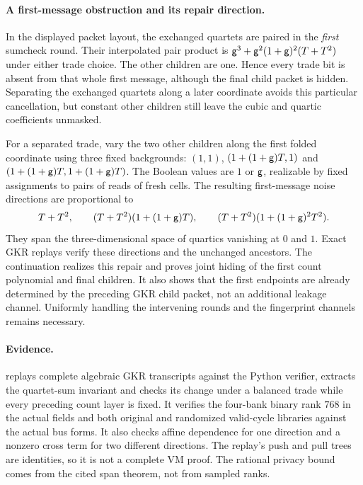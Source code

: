 \paragraph{A first-message obstruction and its repair direction.} In the displayed packet layout, the exchanged quartets are paired in the \emph{first} sumcheck round. Their interpolated pair product is $\mathsf{g}^3+\mathsf{g}^2(1+\mathsf{g})^2(T+T^2)$ under either trade choice. The other children are one. Hence every trade bit is absent from that whole first message, although the final child packet is hidden. Separating the exchanged quartets along a later coordinate avoids this particular cancellation, but constant other children still leave the cubic and quartic coefficients unmasked.

For a separated trade, vary the two other children along the first folded coordinate using three fixed backgrounds: $(1,1)$, $(1+(1+\mathsf{g})T,1)$ and $(1+(1+\mathsf{g})T,1+(1+\mathsf{g})T)$. The Boolean values are $1$ or $\mathsf{g}$, realizable by fixed assignments to pairs of reads of fresh cells. The resulting first-message noise directions are proportional to
\[
 T+T^2,\qquad
 (T+T^2)(1+(1+\mathsf{g})T),\qquad
 (T+T^2)(1+(1+\mathsf{g})^2T^2).
\]
They span the three-dimensional space of quartics vanishing at $0$ and $1$. Exact GKR replays verify these directions and the unchanged ancestors. The continuation  realizes this repair and proves joint hiding of the first count polynomial and final children. It also shows that the first endpoints are already determined by the preceding GKR child packet, not an additional leakage channel. Uniformly handling the intervening rounds and the fingerprint channels remains necessary.

\paragraph{Evidence.}  replays complete algebraic GKR transcripts against the Python verifier, extracts the quartet-sum invariant and checks its change under a balanced trade while every preceding count layer is fixed. It verifies the four-bank binary rank $768$ in the actual fields and both original and randomized valid-cycle libraries against the actual bus forms. It also checks affine dependence for one direction and a nonzero cross term for two different directions. The replay's push and pull trees are identities, so it is not a complete VM proof. The rational privacy bound comes from the cited span theorem, not from sampled ranks.
